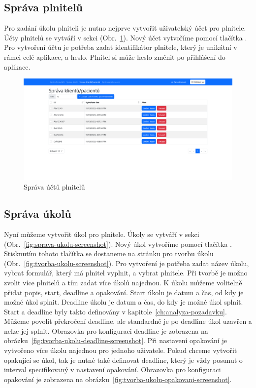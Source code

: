 \subsection{Správa plnitelů}\label{subsec:sprava-plnitelu}

Pro zadání úkolu plniteli je nutno nejprve vytvořit uživatelský účet pro plnitele.
Účty plnitelů se vytváří v sekci  (Obr.~\ref{fig:sprava-plnitelu-screenshot}).
Nový účet vytvoříme pomocí tlačítka .
Pro vytvoření účtu je potřeba zadat identifikátor plnitele, který je unikátní v rámci celé aplikace, a heslo.
Plnitel si může heslo změnit po přihlášení do aplikace.

\begin{figure}[H]
    \centering
    \includegraphics[width=\textwidth]{../img/screenshots/sprava-plnitelu}
    \caption{Správa účtů plnitelů}\label{fig:sprava-plnitelu-screenshot}
\end{figure}

\subsection{Správa úkolů}\label{subsec:sprava-ukolu}

Nyní můžeme vytvořit úkol pro plnitele.
Úkoly se vytváří v sekci  (Obr.~\ref{fig:sprava-ukolu-screenshot}).
Nový úkol vytvoříme pomocí tlačítka .
Stisknutím tohoto tlačítka se dostaneme na stránku pro tvorbu úkolu (Obr.~\ref{fig:tvorba-ukolu-screenshot}).
Pro vytvoření je potřeba zadat název úkolu, vybrat formulář, který má plnitel vyplnit, a vybrat plnitele.
Při tvorbě je možno zvolit více plnitelů a tím zadat více úkolů najednou.
K úkolu můžeme volitelně přidat popis, start, deadline a opakování.
Start úkolu je datum a čas, od kdy je možné úkol splnit.
Deadline úkolu je datum a čas, do kdy je možné úkol splnit.
Start a deadline byly takto definovány v kapitole~\ref{ch:analyza-pozadavku}.
Můžeme povolit překročení deadline, ale standardně je po deadline úkol uzavřen a nelze jej splnit.
Obrazovka pro konfiguraci deadline je zobrazena na obrázku~\ref{fig:tvorba-ukolu-deadline-screenshot}.
Při nastavení opakování je vytvořeno více úkolu najednou pro jednoho uživatele.
Pokud chceme vytvořit opakující se úkol, tak je nutné také definovat deadline, který je vždy posunut o interval specifikovaný v nastavení opakování.
Obrazovka pro konfiguraci opakování je zobrazena na obrázku~\ref{fig:tvorba-ukolu-opakovani-screenshot}.

